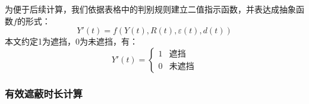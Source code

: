 \documentclass[withoutpreface,bwprint]{cumcmthesis}
\numberwithin{equation}{section} %
\numberwithin{figure}{section} %
\numberwithin{table}{section}  %
\begin{document}
为便于后续计算，我们依据表格中的判别规则建立二值指示函数，并表达成抽象函数$f$的形式：
\begin{equation}
    Y'(t)=f(Y(t),R(t),\varepsilon(t),d(t))
\end{equation}
本文约定1为遮挡，0为未遮挡，有：
\begin{equation}
    Y'(t)=\begin{cases}
    1& \text{遮挡}\\[1.5ex]
    0& \text{未遮挡}
\end{cases}
\end{equation}







\subsubsection{有效遮蔽时长计算}


\end{document}
